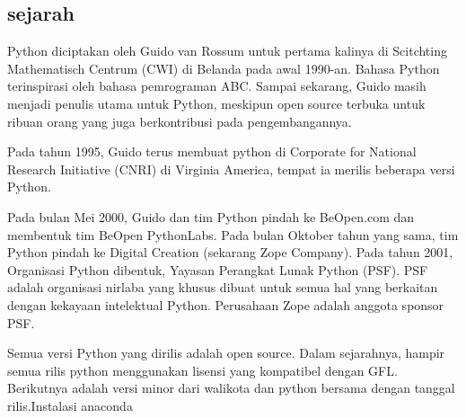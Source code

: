 \subsection{sejarah}
Python diciptakan oleh Guido van Rossum untuk pertama kalinya di Scitchting Mathematisch Centrum (CWI) di Belanda pada awal 1990-an. Bahasa Python terinspirasi oleh bahasa pemrograman ABC. Sampai sekarang, Guido masih menjadi penulis utama untuk Python, meskipun open source terbuka untuk ribuan orang yang juga berkontribusi pada pengembangannya.
\par
Pada tahun 1995, Guido terus membuat python di Corporate for National Research Initiative (CNRI) di Virginia America, tempat ia merilis beberapa versi Python.
\par
Pada bulan Mei 2000, Guido dan tim Python pindah ke BeOpen.com dan membentuk tim BeOpen PythonLabs. Pada bulan Oktober tahun yang sama, tim Python pindah ke Digital Creation (sekarang Zope Company). Pada tahun 2001, Organisasi Python dibentuk, Yayasan Perangkat Lunak Python (PSF). PSF adalah organisasi nirlaba yang khusus dibuat untuk semua hal yang berkaitan dengan kekayaan intelektual Python. Perusahaan Zope adalah anggota sponsor PSF.
\par
Semua versi Python yang dirilis adalah open source. Dalam sejarahnya, hampir semua rilis python menggunakan lisensi yang kompatibel dengan GFL. Berikutnya adalah versi minor dari walikota dan python bersama dengan tanggal rilis.Instalasi anaconda
